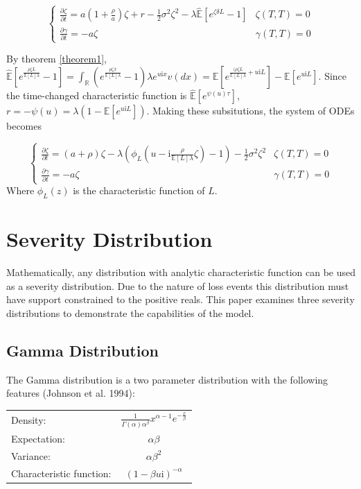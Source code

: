 \documentclass{article}
\theoremstyle{definition}
\begin{document}
\[
\begin{cases}
\frac{\partial \zeta}{\partial t}=a\left(1+\frac{\rho}{a}\right) \zeta+r-\frac{1}{2} \sigma^2 \zeta^2-\lambda \mathbb{\hat{E}}\left[ e^{\zeta \delta L}-1\right] & \zeta(T, T)=0\\
\frac{\partial \gamma}{\partial t}=-a \zeta & \gamma(T, T)=0
\end{cases} \]

By theorem \ref{theorem1}, \(\mathbb{\hat{E}}\left[ e^{ \frac{\rho \zeta L}{\mathbb{E}[L] \lambda}}-1\right]=\int_{\mathbb{R}} \left(e^{\frac{\rho \zeta x}{\mathbb{E}[L] \lambda}}-1\right)\lambda e^{u\mathrm{i}x} v(dx)= \mathbb{E}\left[ e^{ \frac{(\rho \zeta L }{\mathbb{E}[L] \lambda}+u\mathrm{i} L}\right] - \mathbb{E}\left[ e^{u\mathrm{i} L} \right] \).  Since the time-changed characteristic function is \(\mathbb{\hat{E}}\left[e^{\psi(u)\tau} \right] \),  \(r=-\psi(u)=\lambda(1-\mathbb{E}[e^{u\mathrm{i}L}])\).  Making these subsitutions, the system of ODEs becomes

\begin{equation}\label{ode}
\begin{cases}
\frac{\partial \zeta}{\partial t}=(a+\rho) \zeta-\lambda\left(\phi_L(u-\mathrm{i}\frac{\rho}{\mathbb{E}[L] \lambda} \zeta )-1\right)-\frac{1}{2} \sigma^2 \zeta^2 & \zeta(T, T)=0\\
\frac{\partial \gamma}{\partial t}=-a \zeta & \gamma(T, T)=0
\end{cases} \end{equation}
Where \(\phi_L(z)\) is the characteristic function of \(L\).

\section{Severity Distribution}
Mathematically, any distribution with analytic characteristic function can be used as a severity distribution.  Due to the nature of loss events this distribution must have support constrained to the positive reals. This paper examines three severity distributions to demonstrate the capabilities of the model.

\subsection{Gamma Distribution}

The Gamma distribution is a two parameter distribution with the following features (Johnson et al. 1994):

\begin{center}
\begin{tabular}{lc}
Density: & \(\frac{1}{\Gamma(\alpha)\alpha^\beta}x^{\alpha-1} e^{-\frac{x}{\beta}}\)\\
Expectation: & \(\alpha \beta\) \\
Variance: & \(\alpha \beta^2\) \\
Characteristic function: & \((1-\beta u\mathrm{i})^{-\alpha} \)
\end{tabular}
\end{center}
\end{document}
